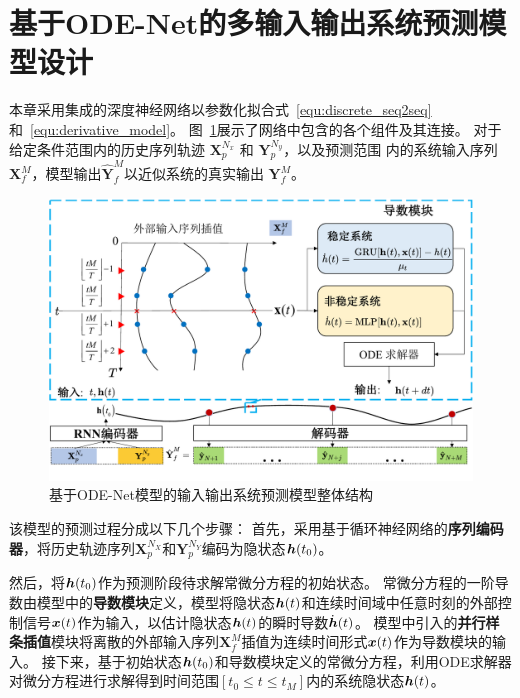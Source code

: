 \section{基于ODE-Net的多输入输出系统预测模型设计}
\label{sec:model}
本章采用集成的深度神经网络以参数化拟合式~\eqref{equ:discrete_seq2seq}和~\eqref{equ:derivative_model}。
图~\ref{fig:model_structure}展示了网络中包含的各个组件及其连接。
对于给定条件范围内的历史序列轨迹 $\boldsymbol{X}_{p}^{N_{x}}$ 和 $\boldsymbol{Y}_{p}^{N_{y}}$，以及预测范围 内的系统输入序列$\boldsymbol{X}_{f}^{M}$，模型输出$\hat{\boldsymbol{Y}}_{f}^{M}$以近似系统的真实输出 $\boldsymbol{Y}_{f}^{M}$。
\begin{figure}[t]
    \centering
    \includegraphics[width=1.0\linewidth]{figures/chapter3/model.pdf}
    \caption{
    基于ODE-Net模型的输入输出系统预测模型整体结构
    }
    \label{fig:model_structure}
\end{figure}
该模型的预测过程分成以下几个步骤：
首先，采用基于循环神经网络的\textbf{序列编码器}，将历史轨迹序列$\boldsymbol{X}_{p}^{N_{X}}$和$\boldsymbol{Y}_{p}^{N_{Y}}$编码为隐状态$\boldsymbol h(t_0)$。

然后，将$\boldsymbol h(t_0)$作为预测阶段待求解常微分方程的初始状态。
常微分方程的一阶导数由模型中的\textbf{导数模块}定义，模型将隐状态$\boldsymbol h(t)$和连续时间域中任意时刻的外部控制信号$\boldsymbol x(t)$作为输入，以估计隐状态$\boldsymbol h(t)$的瞬时导数$\dot{\boldsymbol h}(t)$。
模型中引入的\textbf{并行样条插值}模块将离散的外部输入序列$\boldsymbol{X}_{f}^{M}$插值为连续时间形式$\boldsymbol x(t)$作为导数模块的输入。
接下来，基于初始状态$\boldsymbol h(t_0)$和导数模块定义的常微分方程，利用ODE求解器对微分方程进行求解得到时间范围$[t_0\leq t \leq t_M]$内的系统隐状态$\boldsymbol h(t)$。

